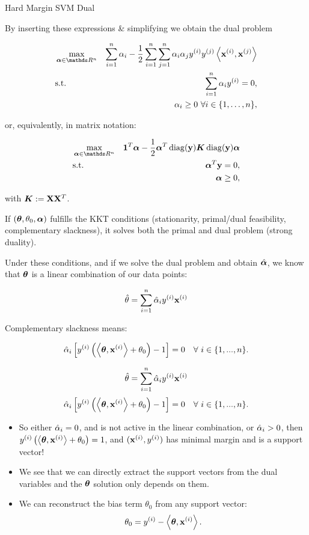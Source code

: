 \documentclass[11pt,compress,t,notes=noshow, xcolor=table]{beamer}
\begin{document}
\begin{vbframe}{Hard Margin SVM Dual}
\framebreak 

By inserting these expressions 
\& simplifying we obtain the dual problem

\vspace*{-0.5cm}
\begin{eqnarray*}
    & \max\limits_{\alphav \in \R^n} & \sum_{i=1}^n \alpha_i - \frac{1}{2}\sum_{i=1}^n\sum_{j=1}^n\alpha_i\alpha_j\yi y^{(j)} \scp{\xi}{\xv^{(j)}} \\
    & \text{s.t.} & \sum_{i=1}^n \alpha_i \yi = 0, \\
    & \quad & \alpha_i \ge 0~\forall i \in \nset,
\end{eqnarray*}

or, equivalently, in matrix notation:

\vspace*{-.5cm}
\begin{eqnarray*}
  & \max\limits_{\alphav \in \R^n} & \one^T \alphav - \frac{1}{2} \alphav^T \diag(\yv)\bm{K} \diag(\yv) \alphav \\
  & \text{s.t.} & \alphav^T \yv = 0, \\
  & \quad & \alphav \geq 0,
\end{eqnarray*}

with $\bm{K}:= \mathbf{X} \mathbf{X}^T$.

\framebreak

If $(\bm{\theta}, \theta_0, \bm{\alpha})$ fulfills the KKT conditions (stationarity, primal/dual feasibility, complementary slackness), it solves both the primal and dual problem (strong duality). 


Under these conditions, and if we solve the dual problem and obtain $\hat{\bm{\alpha}}$, we know that $\bm{\theta}$ is a linear combination of our data points:
  
$$
   \hat{\theta} = \sum\limits_{i=1}^n \hat{\alpha}_i y^{(i)} \mathbf{x}^{(i)} 
$$

Complementary slackness means:

$$
\hat{\alpha}_i \left[y^{(i)}  \left( \left\langle \bm{\theta}, \mathbf{x}^{(i)} \right\rangle + \theta_0 \right) - 1\right] = 0 \quad \forall ~ i \in \{1, ..., n \}.
$$

\framebreak

$$
   \hat{\theta} = \sum\limits_{i=1}^n \hat{\alpha}_i y^{(i)} \mathbf{x}^{(i)} 
$$
$$
\hat{\alpha}_i \left[y^{(i)}  \left( \left\langle \bm{\theta}, \mathbf{x}^{(i)} \right\rangle + \theta_0 \right) - 1\right] = 0 \quad \forall ~ i \in \{1, ..., n \}.
$$

\begin{itemize}
  \item So either $\hat{\alpha}_i = 0$, and is not active in the linear combination,
    or $\hat{\alpha}_i > 0$, then $y^{(i)} \left( \left\langle \bm{\theta}, \mathbf{x}^{(i)} \right\rangle + \theta_0 \right) = 1$, and $(\mathbf{x}^{(i)}, y^{(i)})$ has minimal margin and is a support vector!
  \item We see that we can directly extract the support vectors from the dual variables and the $\bm{\theta}$ solution only depends on them.
  \item We can reconstruct the bias term $\theta_0$ from any support vector:
  $$
  \theta_0 = y^{(i)} - \left\langle \bm{\theta}, \mathbf{x}^{(i)} \right\rangle.
  $$
\end{itemize}


\end{vbframe}
\end{document}
